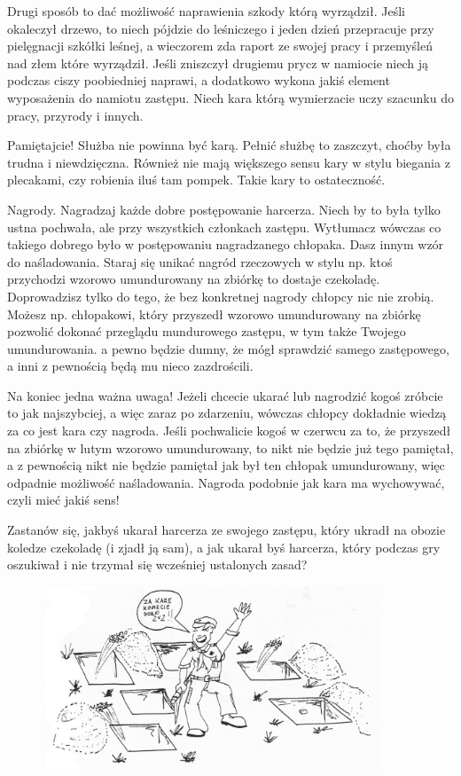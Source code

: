 Drugi sposób to dać możliwość naprawienia szkody którą wyrządził. Jeśli okaleczył drzewo, to niech pójdzie do leśniczego i jeden dzień przepracuje przy pielęgnacji szkółki leśnej, a wieczorem zda raport ze swojej pracy i przemyśleń nad złem które wyrządził. Jeśli zniszczył drugiemu prycz w namiocie niech ją podczas ciszy poobiedniej naprawi, a dodatkowo wykona jakiś element wyposażenia do namiotu zastępu. Niech kara którą wymierzacie uczy szacunku do pracy, przyrody i innych.

Pamiętajcie! Służba nie powinna być karą. Pełnić służbę to zaszczyt, choćby była trudna i niewdzięczna. Również nie mają większego sensu kary  w stylu biegania z plecakami, czy  robienia iluś tam pompek. Takie kary to ostateczność.

Nagrody. Nagradzaj każde dobre postępowanie harcerza. Niech by to była tylko ustna pochwała, ale przy  wszystkich członkach zastępu. Wytłumacz wówczas co takiego dobrego było w postępowaniu nagradzanego chłopaka. Dasz  innym wzór do naśladowania. Staraj się unikać nagród rzeczowych  w  stylu  np. ktoś przychodzi wzorowo umundurowany na zbiórkę to dostaje czekoladę. Doprowadzisz tylko do tego, że bez konkretnej nagrody chłopcy nic nie zrobią. Możesz np. chłopakowi, który przyszedł wzorowo umundurowany na zbiórkę pozwolić dokonać przeglądu mundurowego zastępu, w tym także Twojego  umundurowania.  a  pewno będzie  dumny, że mógł  sprawdzić   samego  zastępowego, a inni z pewnością będą mu nieco  zazdrościli.

Na koniec jedna ważna uwaga! Jeżeli chcecie ukarać lub nagrodzić kogoś zróbcie to jak najszybciej, a więc zaraz po zdarzeniu, wówczas chłopcy dokładnie wiedzą za co jest kara czy nagroda. Jeśli pochwalicie kogoś w czerwcu za to, że przyszedł na zbiórkę w lutym wzorowo umundurowany, to nikt nie będzie już  tego pamiętał, a z pewnością nikt nie będzie pamiętał jak był ten chłopak umundurowany, więc odpadnie możliwość naśladowania. Nagroda podobnie jak kara ma wychowywać, czyli mieć jakiś sens!

Zastanów się, jakbyś ukarał harcerza ze swojego zastępu, który ukradł na obozie  koledze czekoladę (i zjadł  ją sam), a jak ukarał byś harcerza, który podczas gry  oszukiwał i nie trzymał się wcześniej ustalonych zasad?

\begin{figure}[h]
\begin{center}
\includegraphics[width=0.9\textwidth]{grafiki/kara.png}
\end{center}
\end{figure}
	


